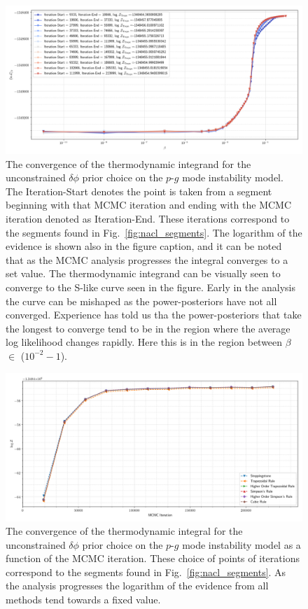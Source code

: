 \begin{figure}[th]
\centering
\includegraphics[width=1.0\columnwidth]{figs/chapter6/lsc_sim_integrand_progress.png}
\caption{The convergence of the thermodynamic integrand for the unconstrained $\delta \phi$ prior choice on the $p$-$g$ mode instability model. The Iteration-Start denotes the point is taken from a segment beginning with that MCMC iteration and ending with the MCMC iteration denoted as Iteration-End. These iterations correspond to the segments found in Fig.~\ref{fig:nacl_segments}. The logarithm of the evidence is shown also in the figure caption, and it can be noted that as the MCMC analysis progresses the integral converges to a set value. The thermodynamic integrand can be visually seen to converge to the S-like curve seen in the figure. Early in the analysis the curve can be mishaped as the power-posteriors have not all converged. Experience has told us tha the power-posteriors that take the longest to converge tend to be in the region where the average log likelihood changes rapidly. Here this is in the region between $\beta$ $\in$ ($10^{-2} - 1$).}
\label{fig:integrand_convergence}
\end{figure}

\begin{figure}[th]
\centering
\includegraphics[width=1.0\columnwidth]{figs/chapter6/lvc_sim_evidence_convergence.png}
\caption{The convergence of the thermodynamic integral for the unconstrained $\delta \phi$ prior choice on the $p$-$g$ mode instability model as a function of the MCMC iteration. These choice of points of iterations correspond to the segments found in Fig.~\ref{fig:nacl_segments}. As the analysis progresses the logarithm of the evidence from all methods tend towards a fixed value.}
\label{fig:integral_convergence}
\end{figure}

